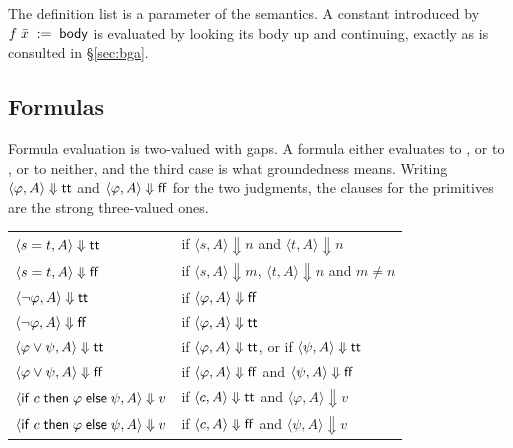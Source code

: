 The definition list is a parameter of the semantics.  A constant introduced by
$f\;\bar{x} \;:=\; \mathsf{body}$ is evaluated by looking its body up and continuing,
exactly as  is consulted in \S\ref{sec:bga}.

\subsection{Formulas}
\label{sec:semantics:formulas}

Formula evaluation is two-valued with gaps.  A formula either evaluates to
, or to , or to neither, and the third case is what groundedness
means.  Writing $\langle \varphi, A \rangle \Downarrow \mathsf{tt}$ and $\langle
\varphi, A \rangle \Downarrow \mathsf{ff}$ for the two judgments, the clauses for the
primitives are the strong three-valued ones.

\begin{center}
\begin{tabular}{@{}ll@{}}
\toprule
$\langle s = t, A\rangle \Downarrow \mathsf{tt}$ &
  if $\langle s, A\rangle \Downarrow n$ and $\langle t, A\rangle \Downarrow n$\\
$\langle s = t, A\rangle \Downarrow \mathsf{ff}$ &
  if $\langle s, A\rangle \Downarrow m$, $\langle t, A\rangle \Downarrow n$ and
  $m \neq n$\\
\midrule
$\langle \neg\varphi, A\rangle \Downarrow \mathsf{tt}$ &
  if $\langle \varphi, A\rangle \Downarrow \mathsf{ff}$\\
$\langle \neg\varphi, A\rangle \Downarrow \mathsf{ff}$ &
  if $\langle \varphi, A\rangle \Downarrow \mathsf{tt}$\\
\midrule
$\langle \varphi \vee \psi, A\rangle \Downarrow \mathsf{tt}$ &
  if $\langle \varphi, A\rangle \Downarrow \mathsf{tt}$, or if
  $\langle \psi, A\rangle \Downarrow \mathsf{tt}$\\
$\langle \varphi \vee \psi, A\rangle \Downarrow \mathsf{ff}$ &
  if $\langle \varphi, A\rangle \Downarrow \mathsf{ff}$ and
  $\langle \psi, A\rangle \Downarrow \mathsf{ff}$\\
\midrule
$\langle \mathsf{if}\;c\;\mathsf{then}\;\varphi\;\mathsf{else}\;\psi, A\rangle \Downarrow v$ &
  if $\langle c, A\rangle \Downarrow \mathsf{tt}$ and
  $\langle \varphi, A\rangle \Downarrow v$\\
$\langle \mathsf{if}\;c\;\mathsf{then}\;\varphi\;\mathsf{else}\;\psi, A\rangle \Downarrow v$ &
  if $\langle c, A\rangle \Downarrow \mathsf{ff}$ and
  $\langle \psi, A\rangle \Downarrow v$\\
\bottomrule
\end{tabular}
\end{center}

